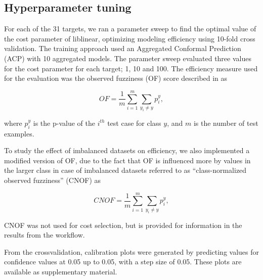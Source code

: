 \documentclass[utf8]{frontiersSCNS} %
\newcommand{\todoil}[1]{\todo[inline]{#1}}
\begin{document}
\subsection{Hyperparameter tuning}

For each of the 31 targets, we ran a parameter sweep to find the optimal value of the
cost parameter of liblinear, optimizing modeling efficiency using 10-fold cross validation. The training
approach used an Aggregated Conformal Prediction (ACP) with 10 aggregated models.
The parameter sweep evaluated three values for the cost parameter for each target; 1, 10 and 100. The
efficiency measure used for the evaluation was the observed fuzziness (OF)
score described in \cite{Vovk2016} as

\begin{equation}
OF =\frac{ 1}{m} \sum\limits_{i=1}^{m} \sum\limits_{y_i \neq y }  p_i^y,		
\end{equation}

where $p_i^y$ is the p-value of the $i^{th}$ test case for class $y$, and $m$ is the number of test examples.

To study the effect of imbalanced datasets on efficiency, we also implemented a modified version of OF, due to the fact that OF is influenced more
by values in the larger class in case of imbalanced datasets referred to as ``class-normalized
observed fuzziness'' (CNOF) as

\begin{equation}
CNOF =\frac{ 1}{m} \sum\limits_{i=1}^{m} \sum\limits_{y_i \neq y }  p_i^y,		
\end{equation}

\todoil{Adapt EQ2 for CNOF}




CNOF was not used for cost selection, but is provided for information in the results from the workflow.

From the crossvalidation, calibration plots were generated by predicting values
for confidence values at 0.05 up to 0.05, with a step size of 0.05. These plots
are available as supplementary material.
\end{document}

